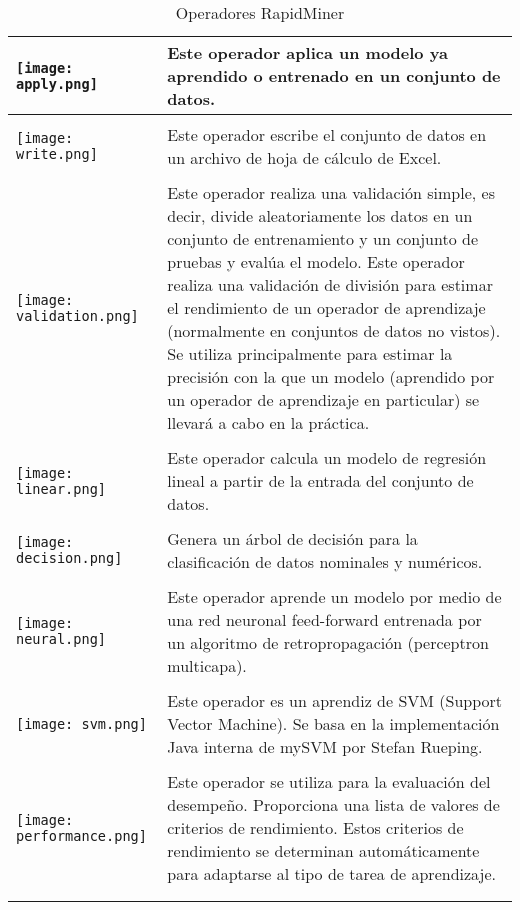 \begin{longtable}{>{\centering\arraybackslash}m{3cm} >{\centering\arraybackslash}m{8cm}}
		 \texttt{[image: apply.png]} & Este operador aplica un modelo ya aprendido o entrenado en un conjunto de datos. \\	\hline \\
		 
		 \texttt{[image: write.png]} &  Este operador escribe el conjunto de datos en un archivo de hoja de cálculo de Excel.\\	\hline \\
		
		 \texttt{[image: validation.png]} & Este operador realiza una validación simple, es decir, divide aleatoriamente los datos en un conjunto de entrenamiento y un conjunto de pruebas y evalúa el modelo. Este operador realiza una validación de división para estimar el rendimiento de un operador de aprendizaje (normalmente en conjuntos de datos no vistos). Se utiliza principalmente para estimar la precisión con la que un modelo (aprendido por un operador de aprendizaje en particular) se llevará a cabo en la práctica. \\	\hline \\
		 
		 \texttt{[image: linear.png]} & Este operador calcula un modelo de regresión lineal a partir de la entrada del conjunto de datos. \\	\hline \\
		 
		 \texttt{[image: decision.png]} & Genera un árbol de decisión para la clasificación de datos nominales y numéricos. \\	\hline \\
		 
		 \texttt{[image: neural.png]} & Este operador aprende un modelo por medio de una red neuronal feed-forward entrenada por un algoritmo de retropropagación (perceptron multicapa).  \\	\hline \\
		 
		 \texttt{[image: svm.png]} & Este operador es un aprendiz de SVM (Support Vector Machine). Se basa en la implementación Java interna de mySVM por Stefan Rueping. \\	\hline \\
		 
		 \texttt{[image: performance.png]} & Este operador se utiliza para la evaluación del desempeño. Proporciona una lista de valores de criterios de rendimiento. Estos criterios de rendimiento se determinan automáticamente para adaptarse al tipo de tarea de aprendizaje. \\	\hline \\		

	\caption{Operadores RapidMiner}
	\label{tabla:operadores}
\end{longtable}